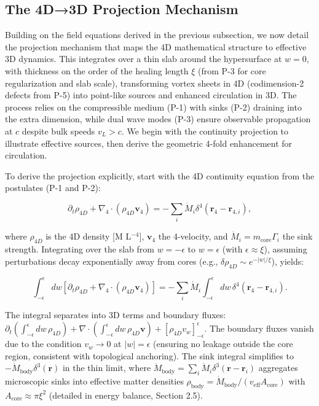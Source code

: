 \subsection{The 4D→3D Projection Mechanism}

Building on the field equations derived in the previous subsection, we now detail the projection mechanism that maps the 4D mathematical structure to effective 3D dynamics. This integrates over a thin slab around the hypersurface at $w=0$, with thickness on the order of the healing length $\xi$ (from P-3 for core regularization and slab scale), transforming vortex sheets in 4D (codimension-2 defects from P-5) into point-like sources and enhanced circulation in 3D. The process relies on the compressible medium (P-1) with sinks (P-2) draining into the extra dimension, while dual wave modes (P-3) ensure observable propagation at $c$ despite bulk speeds $v_L > c$. We begin with the continuity projection to illustrate effective sources, then derive the geometric 4-fold enhancement for circulation.

To derive the projection explicitly, start with the 4D continuity equation from the postulates (P-1 and P-2):

\[
\partial_t \rho_{4D} + \nabla_4 \cdot (\rho_{4D} \mathbf{v}_4) = -\sum_i \dot{M}_i \delta^4(\mathbf{r}_4 - \mathbf{r}_{4,i}),
\]

where $\rho_{4D}$ is the 4D density [M L$^{-4}$], $\mathbf{v}_4$ the 4-velocity, and $\dot{M}_i = m_{\text{core}} \Gamma_i$ the sink strength. Integrating over the slab from $w=-\epsilon$ to $w=\epsilon$ (with $\epsilon \approx \xi$), assuming perturbations decay exponentially away from cores (e.g., $\delta \rho_{4D} \sim e^{-|w|/\xi}$), yields:

\[
\int_{-\epsilon}^{\epsilon} dw \left[ \partial_t \rho_{4D} + \nabla_4 \cdot (\rho_{4D} \mathbf{v}_4) \right] = -\sum_i \dot{M}_i \int_{-\epsilon}^{\epsilon} dw \, \delta^4(\mathbf{r}_4 - \mathbf{r}_{4,i}).
\]

The integral separates into 3D terms and boundary fluxes: $\partial_t \left( \int_{-\epsilon}^{\epsilon} dw \, \rho_{4D} \right) + \nabla \cdot \left( \int_{-\epsilon}^{\epsilon} dw \, \rho_{4D} \mathbf{v} \right) + [\rho_{4D} v_w]_{-\epsilon}^{\epsilon}$. The boundary fluxes vanish due to the condition $v_w \to 0$ at $|w| = \epsilon$ (ensuring no leakage outside the core region, consistent with topological anchoring). The sink integral simplifies to $-\dot{M}_{\text{body}} \delta^3(\mathbf{r})$ in the thin limit, where $\dot{M}_{\text{body}} = \sum_i \dot{M}_i \delta^3(\mathbf{r} - \mathbf{r}_i)$ aggregates microscopic sinks into effective matter densities $\rho_{\text{body}} = \dot{M}_{\text{body}} / (v_{\text{eff}} A_{\text{core}})$ with $A_{\text{core}} \approx \pi \xi^2$ (detailed in energy balance, Section 2.5).


